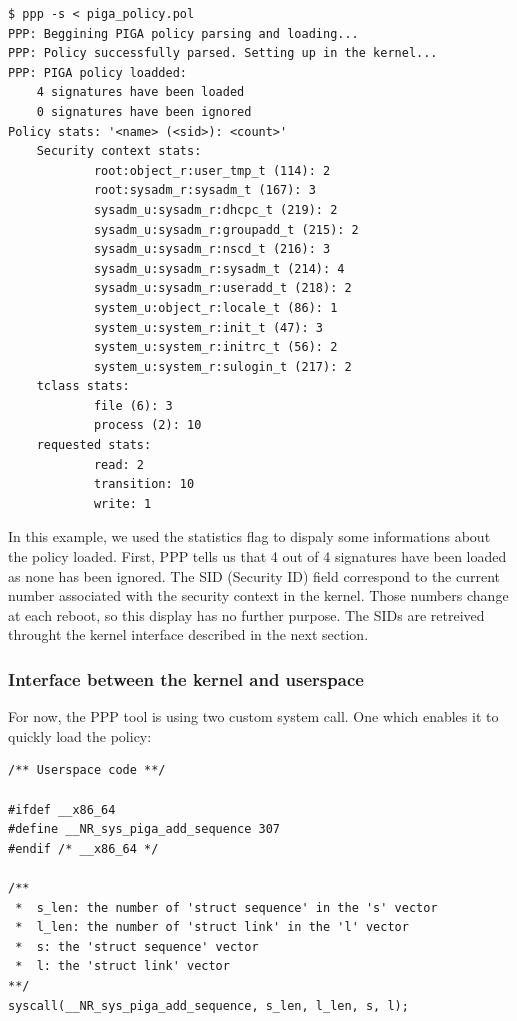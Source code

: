 \documentclass[pdftex,a4paper,titlepage,11pt]{article}
\begin{document}
\begin{lstlisting}
$ ppp -s < piga_policy.pol
PPP: Beggining PIGA policy parsing and loading...
PPP: Policy successfully parsed. Setting up in the kernel...
PPP: PIGA policy loadded:
    4 signatures have been loaded
    0 signatures have been ignored
Policy stats: '<name> (<sid>): <count>'
    Security context stats:
            root:object_r:user_tmp_t (114): 2
            root:sysadm_r:sysadm_t (167): 3
            sysadm_u:sysadm_r:dhcpc_t (219): 2
            sysadm_u:sysadm_r:groupadd_t (215): 2
            sysadm_u:sysadm_r:nscd_t (216): 3
            sysadm_u:sysadm_r:sysadm_t (214): 4
            sysadm_u:sysadm_r:useradd_t (218): 2
            system_u:object_r:locale_t (86): 1
            system_u:system_r:init_t (47): 3
            system_u:system_r:initrc_t (56): 2
            system_u:system_r:sulogin_t (217): 2
    tclass stats:
            file (6): 3
            process (2): 10
    requested stats:
            read: 2
            transition: 10
            write: 1
\end{lstlisting}

\smallskip

In this example, we used the statistics flag to dispaly some informations about
the policy loaded. First, PPP tells us that 4 out of 4 signatures have been
loaded as none has been ignored. The SID (Security ID) field correspond to the
current number associated with the security context in the kernel. Those numbers
change at each reboot, so this display has no further purpose. The SIDs are
retreived throught the kernel interface described in the next section.

\subsubsection{Interface between the kernel and userspace}

For now, the PPP tool is using two custom system call. One which enables it to
quickly load the policy:

\begin{lstlisting}
/** Userspace code **/

#ifdef __x86_64
#define __NR_sys_piga_add_sequence 307
#endif /* __x86_64 */

/**
 *  s_len: the number of 'struct sequence' in the 's' vector
 *  l_len: the number of 'struct link' in the 'l' vector
 *  s: the 'struct sequence' vector
 *  l: the 'struct link' vector
**/
syscall(__NR_sys_piga_add_sequence, s_len, l_len, s, l);
\end{lstlisting}
\end{document}
